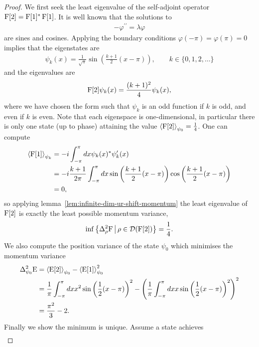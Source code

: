 \begin{proof}
We first seek the least eigenvalue of the self-adjoint operator $\operatorname{F}[2] = \operatorname{F}[1]^*\operatorname{F}[1]$. It is well known that the solutions to
\begin{align}
  -\varphi^{\prime\prime} = \lambda\varphi
\end{align}
are sines and cosines. Applying the boundary conditions $\varphi(-\pi)=\varphi(\pi)=0$ implies that the eigenstates are
\begin{align}
  \psi_k(x) = \frac{1}{\sqrt{\pi}}\sin\left(\frac{k+1}{2}(x-\pi)\right), \qquad k\in\{0,1,2,\hdots\}
\end{align}
and the eigenvalues are
\begin{align}
  \operatorname{F}[2]\psi_k(x) = \frac{(k+1)^2}{4}\psi_k(x),
\end{align}
where we have chosen the form such that $\psi_k$ is an odd function if $k$ is odd, and even if $k$ is even. Note that each eigenspace is one-dimensional, in particular there is only one state (up to phase) attaining the value $\left\langle{\operatorname{F}[2]}\right\rangle_{\psi_0} = \frac{1}{4}$. One can compute
\begin{align}
  \left\langle{\operatorname{F}[1]}\right\rangle_{\psi_k} &= -i\int_{-\pi}^\pi dx \psi_k(x)^* \psi_k^\prime(x)\\
                         &= -i\frac{k+1}{2\pi}\int_{-\pi}^\pi dx \sin\left(\frac{k+1}{2}(x-\pi)\right) \cos\left(\frac{k+1}{2}(x-\pi)\right)\\
                         &= 0,
\end{align}
so applying lemma~\ref{lem:infinite-dim-ur-shift-momentum} the least eigenvalue of $\operatorname{F}[2]$ is exactly the least possible momentum variance,
\begin{align}
  \inf\left\{\varr{\opf}\,\middle|\,\rho\in\dom{\opf[2]}\right\} = \frac{1}{4}.
\end{align}
We also compute the position variance of the state $\psi_0$ which minimises the momentum variance
\begin{align}
  \var[\psi_0]{\ope} &= \expe{\ope[2]}{\psi_0} - \expe{\ope[1]}{\psi_0}^2\\
                     &= \frac{1}{\pi}\int_{-\pi}^\pi dx x^2 \sin\left(\frac{1}{2}(x-\pi)\right)^2 - \left(\frac{1}{\pi}\int_{-\pi}^\pi dx x \sin\left(\frac{1}{2}(x-\pi)\right)^2\right)^2\\
                     &= \frac{\pi^2}{3} - 2.
\end{align}
Finally we show the minimum is unique. Assume a state achieves 
\begin{align}

\end{align}
\end{proof}
